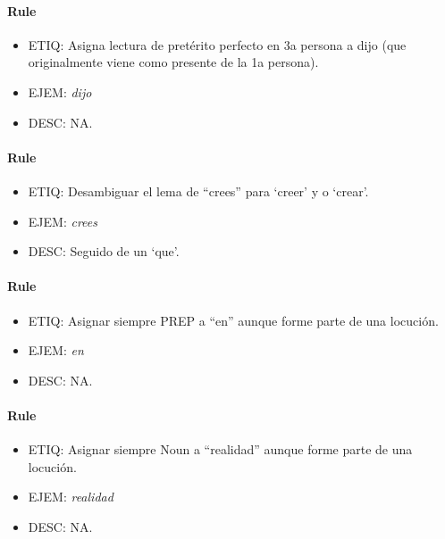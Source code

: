 \documentclass[11pt]{report}
\begin{document}
\paragraph*{Rule}
\begin{itemize}
\item ETIQ: Asigna lectura de pretérito perfecto en 3a persona a dijo (que originalmente viene como presente de la 1a persona).
\item EJEM: \emph{dijo}
\item DESC: NA.
\end{itemize}

\paragraph*{Rule}
\begin{itemize}
\item ETIQ: Desambiguar el lema de ``crees'' para `creer' y o `crear'.
\item EJEM: \emph{crees}
\item DESC: Seguido de un `que'.
\end{itemize}

\paragraph*{Rule}
\begin{itemize}
\item ETIQ: Asignar siempre PREP a ``en'' aunque forme parte de una locución.
\item EJEM: \emph{en}
\item DESC: NA.
\end{itemize}

\paragraph*{Rule}
\begin{itemize}
\item ETIQ: Asignar siempre Noun a ``realidad'' aunque forme parte de una locución.
\item EJEM: \emph{realidad}
\item DESC: NA.
\end{itemize}
\end{document}
